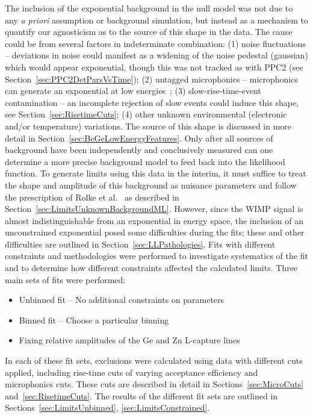 The inclusion of the exponential background in the null model was not due to any \emph{a priori} assumption or background simulation, but instead as a mechanism to quantify our agnosticism as to the source of this shape in the data.  The cause could be from several factors in indeterminate combination: (1) noise fluctuations -- deviations in noise could manifest as a widening of the noise pedestal (gaussian) which would appear exponential, though this was not tracked as with PPC2 (see Section~\ref{sec:PPC2DetParsVsTime}); (2) untagged microphonics -- microphonics can generate an exponential at low energies~\cite{Morales1992410}; (3) slow-rise-time-event contamination -- an incomplete rejection of slow events could induce this shape, see Section~\ref{sec:RisetimeCuts}; (4) other unknown environmental (electronic and/or temperature) variations.  The source of this shape is discussed in more detail in Section~\ref{sec:BeGeLowEnergyFeatures}.  Only after all sources of background have been independently and conclusively measured can one determine a more precise background model to feed back into the likelihood function.  To generate limits using this data in the interim, it must suffice to treat the shape and amplitude of this background as nuisance parameters and follow the prescription of Rolke et al.~\cite{Rol05} as described in Section~\ref{sec:LimitsUnknownBackgroundML}.  However, since the WIMP signal is almost indistinguishable from an exponential in energy space, the inclusion of an unconstrained exponential posed some difficulties during the fits; these and other difficulties are outlined in Section~\ref{sec:LLPathologies}.
Fits with different constraints and methodologies were performed to investigate systematics of the fit and to determine how different constraints affected the calculated limits.  Three main sets of fits were performed:
		\begin{itemize}
			\item Unbinned fit -- No additional constraints on parameters
			\item Binned fit -- Choose a particular binning
			\item Fixing relative amplitudes of the Ge and Zn L-capture lines
		\end{itemize}			
In each of these fit sets, exclusions were calculated using data with different cuts applied, including rise-time cuts of varying acceptance efficiency and microphonics cuts.  These cuts are described in detail in Sections~\ref{sec:MicroCuts} and~\ref{sec:RisetimeCuts}.
The results of the different fit sets are outlined in Sections~\ref{sec:LimitsUnbinned}, \ref{sec:LimitsConstrained}.  

